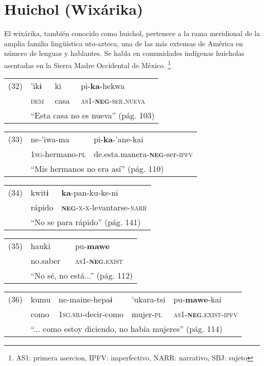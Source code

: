 \section*{Huichol (Wixárika)}

\noindent El wixárika, también conocido como huichol, pertenece a la rama meridional de la amplia familia lingüística uto-azteca, una de las más extensas de América en número de lenguas y hablantes. Se habla en comunidades indígenas huicholas asentadas en la Sierra Madre Occidental de México. \vspace{0.5cm}
\footnote{AS1: primera asercion, IPFV: imperfectivo, NARR: narrativo, SBJ: sujeto}
{\setmainfont{Charis SIL} 

\begin{tabular}{llll}
(32) & 'ikɨ & ki & pi-\textbf{ka}-hekwa \\
& \textsc{dem} & casa & \textsc{as1-\textbf{neg}-ser.nueva} \\
& \multicolumn{3}{l}{``Esta casa no es nueva'' (pág. 103)}
\end{tabular} \vspace{0.5cm}

\begin{tabular}{lll}
(33) & ne-'iwa-ma & pi-\textbf{ka}-'ane-kai \\
& \textsc{1sg}-hermano-\textsc{pl} & de.esta.manera-\textsc{\textbf{neg}}-ser-\textsc{ipfv} \\
& \multicolumn{2}{l}{``Mis hermanos no era así'' (pág. 110)}
\end{tabular} \vspace{0.3cm}

\begin{tabular}{lll}
(34) & kwitɨ & \textbf{ka}-pan-ku-ke-ni \\
& rápido & \textsc{\textbf{neg}-x-x}-levantarse-\textsc{narr} \\
& \multicolumn{2}{l}{``No se para rápido'' (pág. 141)}
\end{tabular} \vspace{0.3cm}

\begin{tabular}{lll}
(35) & hauki & pu-\textbf{mawe} \\
& no.saber & \textsc{as1-\textbf{neg}.exist} \\
& \multicolumn{2}{l}{``No sé, no está...'' (pág. 112)}
\end{tabular} \vspace{0.3cm}

\begin{tabular}{lllll}
(36) & kumu & ne-maine-hepaɨ & 'ukara-tsi & pu-\textbf{mawe}-kai \\
& como & \textsc{1sg.sbj}-decir-como & mujer-\textsc{pl} & \textsc{as1-\textbf{neg}.exist-ipfv} \\
& \multicolumn{4}{l}{``... como estoy diciendo, no había mujeres'' (pág. 114)}
\end{tabular} \vspace{0.3cm}

}

